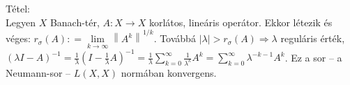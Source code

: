 \documentclass[12pt,a4paper]{scrartcl}
\newenvironment{tetel}{}{}
\begin{document}
\begin{tetel}

Tétel:\\
Legyen \(X\) Banach-tér, \(\left. A:X\rightarrow X \right.\) korlátos,
lineáris operátor. Ekkor létezik és véges:
\(r_{\sigma}\left( A \right): = \lim\limits_{k\rightarrow\infty}\left\| A^{k} \right\|^{1/k}\).
Továbbá
\(\left. \left| \lambda \right| > r_{\sigma}\left( A \right)\Rightarrow\lambda \right.\)
reguláris érték,
\(\left( {\lambda I - A} \right)^{- 1} = \frac{1}{\lambda}\left( {I - \frac{1}{\lambda}A} \right)^{- 1} = \frac{1}{\lambda}{\sum\limits_{k = 0}^{\infty}{\frac{1}{\lambda^{k}}A^{k}}} = {\sum\limits_{k = 0}^{\infty}{\lambda^{- k - 1}A^{k}}}\).
Ez a sor -- a Neumann-sor -- \(L\left( {X,X} \right)\) normában
konvergens.

\end{tetel}
\end{document}
